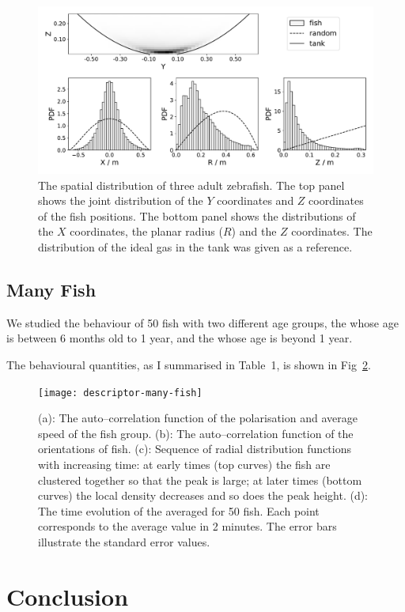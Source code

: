 \documentclass[11pt,twoside]{report}
\begin{document}
\begin{figure}
  \includegraphics[width=\linewidth,outer]{density-three-fish}
  \caption[The 3D spatial distribution of three fish]{The spatial distribution of three adult zebrafish. The top panel shows the joint distribution of the $Y$ coordinates and $Z$ coordinates of the fish positions. The bottom panel shows the distributions of the $X$ coordinates, the planar radius ($R$) and the $Z$ coordinates. The distribution of the ideal gas in the tank was given as a reference.}
  \label{fig:density_3d_fish_3}
\end{figure}

\subsection{Many Fish}
\label{section:fish_many_3d}

We studied the behaviour of 50 fish with two different age groups, the {\smallfish} whose age is between 6 months old to 1 year, and the {\bigfish} whose age is beyond 1 year.

The behavioural quantities, as I summarised in Table~1, is shown in Fig~\ref{fig:descriptor-many-fish}.

\begin{figure}
  \texttt{[image: descriptor-many-fish]}
  \caption[The behavioural descriptors of 50 zebrafish]{
  	(a): The auto--correlation function of the polarisation and average speed of the fish group.
	(b): The auto--correlation function of the orientations of fish.
	(c): Sequence of radial distribution functions with increasing time: at early times (top curves) the fish are clustered together so that the peak is large; at later times (bottom curves) the local density decreases and so does the peak height.
	(d): The time evolution of the averaged {\descriptors} for 50 {\smallfish} fish. Each point corresponds to the average value in 2 minutes.
	The error bars illustrate the standard error values.
  }
  \label{fig:descriptor-many-fish}
\end{figure}

\section{Conclusion}
\end{document}
